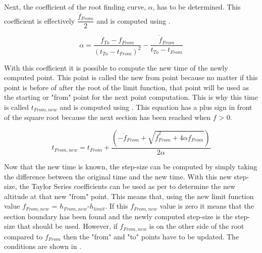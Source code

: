 \noindent
Next, the coefficient of the root finding curve, $\alpha$, has to be determined. This coefficient is effectively $\dfrac{\ddot{f}_{From}}{2}$ and is computed using .

\begin{equation} \label{eq:alphaForRoot}
\alpha = \dfrac{f_{To}-f_{From}}{\left(t_{To}-t_{From}\right)^{2}}-\dfrac{\dot{f}_{From}}{t_{To}-t_{From}}
\end{equation}


\noindent
With this coefficient it is possible to compute the new time of the newly computed point. This point is called the new from point because no matter if this point is before of after the root of the limit function, that point will be used as the starting or "from" point for the next point computation. This is why this time is called $t_{From,new}$ and is computed using . This equation has a plus sign in front of the square root because the next section has been reached when $f$ > 0.

\begin{equation} \label{eq:tFromNew}
t_{From,new} = t_{From}+\dfrac{\left(-\dot{f}_{From}+\sqrt{\dot{f}_{From}^{2}+4\alpha f_{From}}\right)}{2\alpha}
\end{equation}

\noindent
Now that the new time is known, the step-size can be computed by simply taking the difference between the original time and the new time. With this new step-size, the Taylor Series coefficients can be used as per  to determine the new altitude at that new "from" point. This means that, using  the new limit function value $f_{From,new}$ = $h_{From,new}$-$h_{limit}$. If this $f_{From,new}$ value is zero it means that the section boundary has been found and the newly computed step-size is the step-size that should be used. However, if $f_{From,new}$ is on the other side of the root compared to $f_{From}$ then the "from" and "to" points have to be updated. The conditions are shown in .

